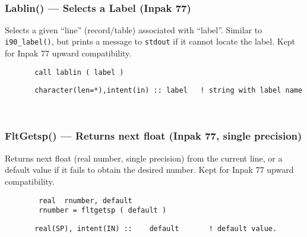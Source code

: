  
\mbox{}\hrulefill\ 

  \subsubsection{Lablin() --- Selects a Label (Inpak 77) }

      Selects a given ``line'' (record/table) associated with ``label''. 
      Similar to {\tt i90\_label()}, but prints a message to {\tt stdout}
      if it cannot locate the label. Kept for Inpak 77 upward compatibility.
  
\begin{verbatim}       call lablin ( label )\end{verbatim}
\begin{verbatim} 
       character(len=*),intent(in) :: label   ! string with label name
\end{verbatim}
 
 
\mbox{}\hrulefill\ 
 
  \subsubsection{FltGetsp() --- Returns next float (Inpak 77, single precision) }

    Returns next float (real number, single precision) from the current 
    line, or a default value if it fails to obtain the desired number.
    Kept for Inpak 77 upward compatibility.
  
\begin{verbatim}        real  rnumber, default
        rnumber = fltgetsp ( default )\end{verbatim}
\begin{verbatim}       real(SP), intent(IN) ::    default       ! default value.
 \end{verbatim}%
 
